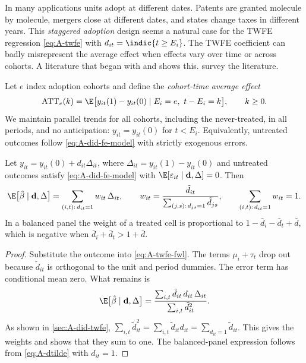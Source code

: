 In many applications units adopt at different dates. Patents are granted molecule by molecule, mergers close at
different dates, and states change taxes in different years. This \emph{staggered adoption} design seems a natural
case for the TWFE regression \eqref{eq:A-twfe} with $d_{it}=\indic\{t\ge E_i\}$. The TWFE coefficient can badly
misrepresent the average effect when effects vary over time or across cohorts. A literature that began with
\citet{GoodmanBacon2021} and \citet{deChaisemartinDHaultfoeuille2020} shows this. \citet{RothEtAl2023} survey the
literature.

Let $e$ index adoption cohorts and define the \emph{cohort-time average effect}
\begin{equation*}
\mathrm{ATT}_e(k)=\E\big[y_{it}(1)-y_{it}(0)\mid E_i=e,\ t-E_i=k\big],\qquad k\ge0 .
\end{equation*}
We maintain parallel trends for all cohorts, including the never-treated, in all periods, and no anticipation:
$y_{it}=y_{it}(0)$ for $t<E_i$. Equivalently, untreated outcomes follow \eqref{eq:A-did-fe-model} with strictly
exogenous errors.

\begin{proposition}\label{prop:A-twfe-weights}
Let $y_{it}=y_{it}(0)+d_{it}\Delta_{it}$, where $\Delta_{it}=y_{it}(1)-y_{it}(0)$ and untreated outcomes satisfy
\eqref{eq:A-did-fe-model} with $\E[\varepsilon_{it}\mid\mathbf{d},\Delta]=0$. Then
\begin{equation*}
\E\big[\hat\beta\mid\mathbf{d},\Delta\big]=\sum_{(i,t):\,d_{it}=1}w_{it}\,\Delta_{it},\qquad
w_{it}=\frac{\tilde d_{it}}{\sum_{(j,s):\,d_{js}=1}\tilde d_{js}},\qquad \sum_{(i,t):\,d_{it}=1}w_{it}=1 .
\end{equation*}
In a balanced panel the weight of a treated cell is proportional to $1-\bar d_i-\bar d_t+\bar d$, which is negative
when $\bar d_i+\bar d_t>1+\bar d$.
\end{proposition}

\begin{proof}
Substitute the outcome into \eqref{eq:A-twfe-fwl}. The terms $\mu_i+\tau_t$ drop out because $\tilde d_{it}$ is
orthogonal to the unit and period dummies. The error term has conditional mean zero. What remains is
\begin{equation*}
\E\big[\hat\beta\mid\mathbf{d},\Delta\big]=\frac{\sum_{i,t}\tilde d_{it}\,d_{it}\,\Delta_{it}}{\sum_{i,t}\tilde d_{it}^2}.
\end{equation*}
As shown in \cref{sec:A-did-twfe}, $\sum_{i,t}\tilde d_{it}^2=\sum_{i,t}\tilde d_{it}d_{it}=\sum_{d_{it}=1}\tilde d_{it}$.
This gives the weights and shows that they sum to one. The balanced-panel expression follows from
\eqref{eq:A-dtilde} with $d_{it}=1$.
\end{proof}

